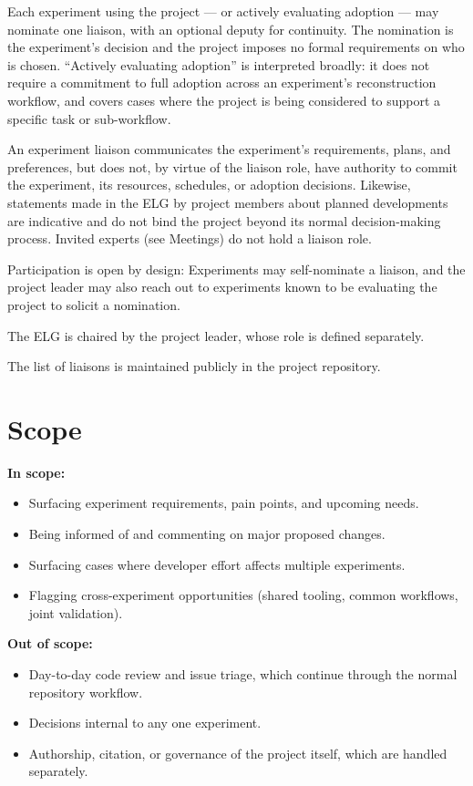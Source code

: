 \documentclass[11pt,a4paper]{article}
\begin{document}
Each experiment using the project --- or actively evaluating adoption --- may nominate one liaison, with an optional deputy for continuity. The nomination is the experiment's decision and the project imposes no formal requirements on who is chosen. ``Actively evaluating adoption'' is interpreted broadly: it does not require a commitment to full adoption across an experiment's reconstruction workflow, and covers cases where the project is being considered to support a specific task or sub-workflow.

An experiment liaison communicates the experiment's requirements, plans, and preferences, but does not, by virtue of the liaison role, have authority to commit the experiment, its resources, schedules, or adoption decisions. Likewise, statements made in the ELG by project members about planned developments are indicative and do not bind the project beyond its normal decision-making process. Invited experts (see Meetings) do not hold a liaison role.

Participation is open by design: Experiments may self-nominate a liaison, and the project leader may also reach out to experiments known to be evaluating the project to solicit a nomination.

The ELG is chaired by the project leader, whose role is defined separately.

The list of liaisons is maintained publicly in the project repository.

\section*{Scope}

\textbf{In scope:}

\begin{itemize}
    \item Surfacing experiment requirements, pain points, and upcoming needs.
    \item Being informed of and commenting on major proposed changes.
    \item Surfacing cases where developer effort affects multiple experiments.
    \item Flagging cross-experiment opportunities (shared tooling, common workflows, joint validation).
\end{itemize}

\textbf{Out of scope:}

\begin{itemize}
    \item Day-to-day code review and issue triage, which continue through the normal repository workflow.
    \item Decisions internal to any one experiment.
    \item Authorship, citation, or governance of the project itself, which are handled separately.
\end{itemize}
\end{document}
